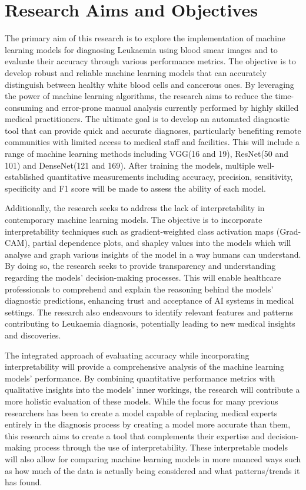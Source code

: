 \documentclass[
	a4paper,
	10pt,
	unnumberedsections,
	twoside,
]{research_article}
\begin{document}
\section{Research Aims and Objectives}

The primary aim of this research is to explore the implementation of machine learning models for diagnosing Leukaemia using blood smear images and to evaluate their accuracy through various performance metrics. The objective is to develop robust and reliable machine learning models that can accurately distinguish between healthy white blood cells and cancerous ones. By leveraging the power of machine learning algorithms, the research aims to reduce the time-consuming and error-prone manual analysis currently performed by highly skilled medical practitioners. The ultimate goal is to develop an automated diagnostic tool that can provide quick and accurate diagnoses, particularly benefiting remote communities with limited access to medical staff and facilities. This will include a range of machine learning methods including VGG(16 and 19), ResNet(50 and 101) and DenseNet(121 and 169). After training the models, multiple well-established quantitative measurements including accuracy, precision, sensitivity, specificity and F1 score will be made to assess the ability of each model.

Additionally, the research seeks to address the lack of interpretability in contemporary machine learning models. The objective is to incorporate interpretability techniques such as gradient-weighted class activation maps (Grad-CAM), partial dependence plots, and shapley values into the models which will analyse and graph various insights of the model in a way humans can understand. By doing so, the research seeks to provide transparency and understanding regarding the models' decision-making processes. This will enable healthcare professionals to comprehend and explain the reasoning behind the models' diagnostic predictions, enhancing trust and acceptance of AI systems in medical settings. The research also endeavours to identify relevant features and patterns contributing to Leukaemia diagnosis, potentially leading to new medical insights and discoveries.

\newpage
The integrated approach of evaluating accuracy while incorporating interpretability will provide a comprehensive analysis of the machine learning models' performance. By combining quantitative performance metrics with qualitative insights into the models' inner workings, the research will contribute a more holistic evaluation of these models. While the focus for many previous researchers has been to create a model capable of replacing medical experts entirely in the diagnosis process by creating a model more accurate than them, this research aims to create a tool that complements their expertise and decision-making process through the use of interpretability. These interpretable models will also allow for comparing machine learning models in more nuanced ways  such as how much of the data is actually being considered and what patterns/trends it has found.
\end{document}
